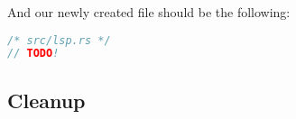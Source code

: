 And our newly created file should be the following:

\begin{lstlisting}[language=rust]
/* src/lsp.rs */
// TODO!
\end{lstlisting}

\subsection{Cleanup}







